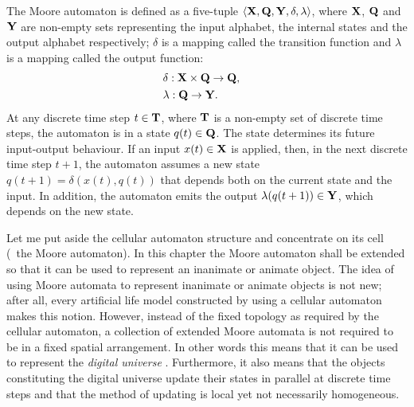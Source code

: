 \begin{defn}
\label{def:Moore}
The Moore automaton is defined as a five-tuple $\langle{\ensuremath{\mathbf{X}}},{\mathbf{Q}},{\mathbf{Y}},\delta,\lambda\rangle$, where ${\mathbf{X}}$, ${\mathbf{Q}}$ and ${\mathbf{Y}}$ are non-empty sets representing the input alphabet, the internal states and the output alphabet respectively; $\delta$ is a mapping called the transition function and $\lambda$ is a mapping called the output function:
\begin{eqnarray}
& \delta: {\mathbf{X}}\times {\ensuremath{\mathbf{Q}}}\rightarrow {\ensuremath{\mathbf{Q}}}, & \\
& \lambda: {\mathbf{Q}}\rightarrow {\ensuremath{\mathbf{Y}}}. &
\end{eqnarray}
At any discrete time step $t \in {\ensuremath{\mathbf{T}}}$, where ${\mathbf{T}}$ is a non-empty set of discrete time steps, the automaton is in a state $q(t) \in {\ensuremath{\mathbf{Q}}}$. The state determines its future input-output behaviour. If an input $x(t) \in {\ensuremath{\mathbf{X}}}$ is applied, then, in the next discrete time step $t+1$, the automaton assumes a new state $q(t+1) = \delta(x(t),q(t))$ that depends both on the current state and the input. In addition, the automaton emits the output $\lambda(q(t+1)) \in {\ensuremath{\mathbf{Y}}}$, which depends on the new state.
\end{defn}

Let me put aside the cellular automaton structure and concentrate on its cell (\ie\ the Moore automaton). In this chapter the Moore automaton shall be extended so that it can be used to represent an inanimate or animate object. The idea of using Moore automata to represent inanimate or animate objects is not new; after all, every artificial life model constructed by using a cellular automaton makes this notion. However, instead of the fixed topology as required by the cellular automaton, a collection of extended Moore automata is not required to be in a fixed spatial arrangement. In other words this means that it can be used to represent the \emph{digital universe} \cite{bentley:2002}. Furthermore, it also means that the objects constituting the digital universe update their states in parallel at discrete time steps and that the method of updating is local yet not necessarily homogeneous. 


